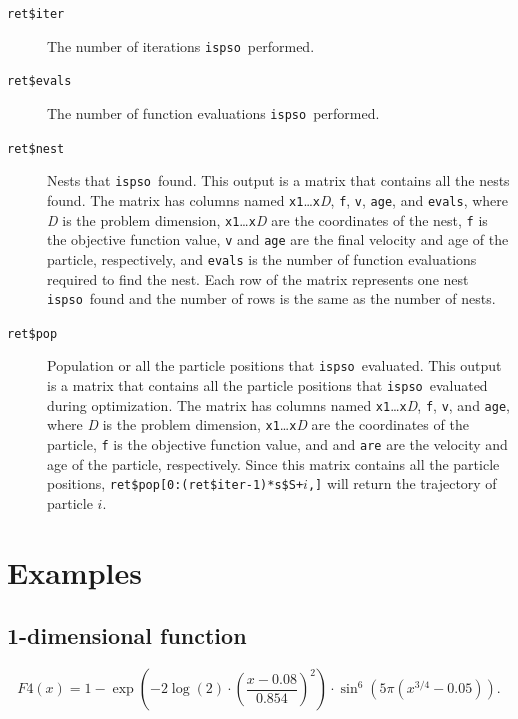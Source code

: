 \documentclass{article}
\def\ispso{\texttt{ispso}}
\begin{document}
\begin{description}
  \item[\texttt{ret\$iter}]
    The number of iterations \ispso\ performed.
  \item[\texttt{ret\$evals}]
    The number of function evaluations \ispso\ performed.
  \item[\texttt{ret\$nest}]
    Nests that \ispso\ found.
    This output is a matrix that contains all the nests found.
    The matrix has columns named \texttt{x1}\dots\texttt{x}\textit{D}, \texttt{f}, \texttt{v}, \texttt{age}, and \texttt{evals}, where \textit{D} is the problem dimension, \texttt{x1}\dots\texttt{x}\textit{D} are the coordinates of the nest, \texttt{f} is the objective function value, \texttt{v} and \texttt{age} are the final velocity and age of the particle, respectively, and \texttt{evals} is the number of function evaluations required to find the nest.
    Each row of the matrix represents one nest \ispso\ found and the number of rows is the same as the number of nests.
  \item[\texttt{ret\$pop}]
    Population or all the particle positions that \ispso\ evaluated.
    This output is a matrix that contains all the particle positions that \ispso\ evaluated during optimization.
    The matrix has columns named \texttt{x1}\dots\texttt{x}\textit{D}, \texttt{f}, \texttt{v}, and \texttt{age}, where \textit{D} is the problem dimension, \texttt{x1}\dots\texttt{x}\textit{D} are the coordinates of the particle, \texttt{f} is the objective function value, and  and \texttt{are} are the velocity and age of the particle, respectively.
    Since this matrix contains all the particle positions, \texttt{ret\$pop[0:(ret\$iter-1)*s\$S+$i$,]} will return the trajectory of particle $i$.
\end{description}

\section{Examples}

\subsection{1-dimensional function}

\begin{equation*}
  F4(x)=1-\exp\left(-2\log(2)\cdot\left(\frac{x-0.08}{0.854}\right)^2\right)
    \cdot\sin^6\left(5\pi(x^{3/4}-0.05)\right).
\end{equation*}
\end{document}
